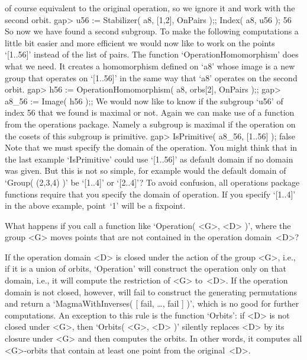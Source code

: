 of course equivalent to the original operation,  so we ignore it and work
with the second orbit.
\beginexample
    gap> u56 := Stabilizer( a8, [1,2], OnPairs );; Index( a8, u56 );
    56 
\endexample
So   now   we have  found   a  second subgroup.   To   make the following
computations a little bit easier and more efficient  we would now like to
work on the points `[1..56]'  instead of the list  of pairs. The function
`OperationHomomorphism' does what  we need.   It creates a   homomorphism
defined on `a8' whose image is a new group  that operates on `[1..56]' in
the same way that `a8' operates on the second orbit.
\beginexample
    gap> h56 := OperationHomomorphism( a8, orbs[2], OnPairs );;
    gap> a8_56 := Image( h56 );;
\endexample
We would now like to know if the subgroup `u56' of index 56 that we found
is  maximal or  not.   Again  we can make  use  of  a function  from  the
operations package.  Namely a subgroup is maximal if the operation on the
cosets of  this subgroup is primitive.
\beginexample
    gap> IsPrimitive( a8_56, [1..56] );
    false 
\endexample
Note that we  must specify the domain  of the operation. You might  think
that  in the last example   `IsPrimitive' could use `[1..56]' as  default
domain  if no domain was given.  But this is   not so simple, for example
would the  default domain of `Group(  (2,3,4) )' be `[1..4]' or `[2..4]'?
To  avoid confusion,  all  operations package  functions require that you
specify the  domain of operation. If  you  specify `[1..4]' in  the above
example, point~`1' will be a fixpoint.

\exercise What happens if  you call a function  like `Operation( <G>, <D>
)',  where the group  <G>  moves points  that are   not contained in  the
operation domain~<D>?

\answer If the  operation domain <D> is  closed  under the action  of the
group <G>, i.e., if  it is a union of  orbits, `Operation' will construct
the operation only on that domain, i.e.,  it will compute the restriction
of <G> to~<D>. If  the operation domain  is  not closed, however,  {\GAP}
will   fail to construct  the     generating permutations and return    a
`MagmaWithInverses( [ fail,  \dots,  fail  ] )',  which  is no  good  for
further computations. An exception to this rule is the function `Orbits':
if  <D> is not   closed under <G>, then    `Orbits( <G>, <D> )'  silently
replaces  <D> by its  closure under <G>  and then computes the orbits. In
other words, it  computes all <G>-orbits that contain  at least one point
from the original~<D>.

